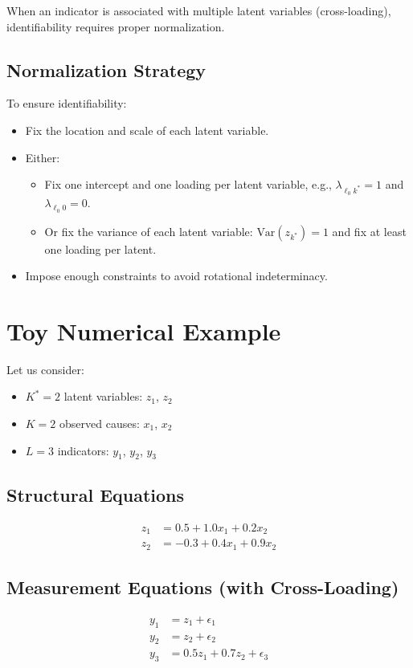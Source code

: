 \documentclass[12pt,a4paper]{article}
\begin{document}
When an indicator is associated with multiple latent variables (cross-loading), identifiability requires proper normalization.

\subsection*{Normalization Strategy}

To ensure identifiability:

\begin{itemize}
    \item Fix the location and scale of each latent variable.
    \item Either:
        \begin{itemize}
            \item Fix one intercept and one loading per latent variable, e.g., $\lambda_{\ell_0 k^*} = 1$ and $\lambda_{\ell_0 0} = 0$.
            \item Or fix the variance of each latent variable: $\text{Var}(z_{k^*}) = 1$ and fix at least one loading per latent.
        \end{itemize}
    \item Impose enough constraints to avoid rotational indeterminacy.
\end{itemize}

\section*{Toy Numerical Example}

Let us consider:

\begin{itemize}
    \item $K^* = 2$ latent variables: $z_1$, $z_2$
    \item $K = 2$ observed causes: $x_1$, $x_2$
    \item $L = 3$ indicators: $y_1$, $y_2$, $y_3$
\end{itemize}

\subsection*{Structural Equations}
\[
\begin{aligned}
z_1 &= 0.5 + 1.0 x_1 + 0.2 x_2 \\
z_2 &= -0.3 + 0.4 x_1 + 0.9 x_2
\end{aligned}
\]

\subsection*{Measurement Equations (with Cross-Loading)}
\[
\begin{aligned}
y_1 &= z_1 + \epsilon_1 \\
y_2 &= z_2 + \epsilon_2 \\
y_3 &= 0.5 z_1 + 0.7 z_2 + \epsilon_3
\end{aligned}
\]
\end{document}
